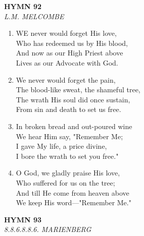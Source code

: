 \documentclass[11pt,a4paper]{article}
\begin{document}
\newpage
\begin{center}
    {\Large \textbf{HYMN 92\textdagger{}}}
    \\
    \textit{L.M. MELCOMBE}
\end{center}
\vspace{1em}

\begin{enumerate}
    \item WE never would forget His love, \\
        Who has redeemed us by His blood, \\
        And now as our High Priest above \\
        Lives as our Advocate with God.

    \item We never would forget the pain, \\
        The blood-like sweat, the shameful tree, \\
        The wrath His soul did once sustain, \\
        From sin and death to set us free.

    \item In broken bread and out-poured wine \\
        We hear Him say, "Remember Me; \\
        I gave My life, a price divine, \\
        I bore the wrath to set you free."

    \item O God, we gladly praise His love, \\
        Who suffered for us on the tree; \\
        And till He come from heaven above \\
        We keep His word---"Remember Me."

\end{enumerate}

\newpage
\begin{center}
    {\Large \textbf{HYMN 93\textdagger{}}}
    \\
    \textit{8.8.6.8.8.6. MARIENBERG}
\end{center}
\vspace{1em}
\end{document}
